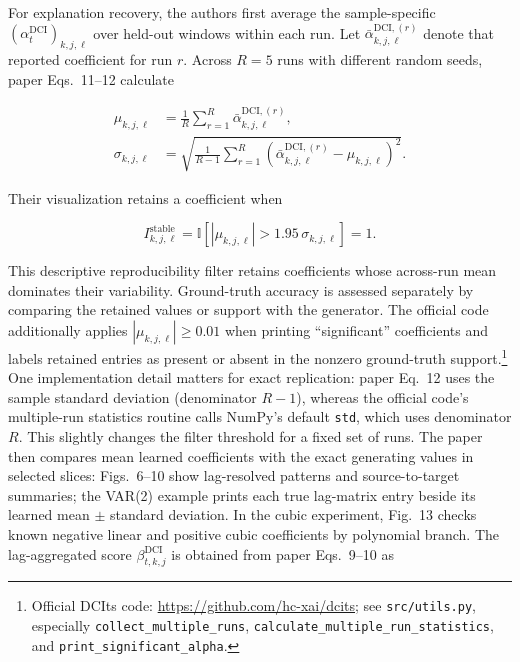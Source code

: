 For explanation recovery, the authors first average the sample-specific
$(\alpha^{\mathrm{DCI}}_t)_{k,j,\ell}$ over held-out windows within each run.
Let $\bar\alpha^{\mathrm{DCI},(r)}_{k,j,\ell}$ denote that reported coefficient
for run $r$. Across $R=5$ runs with different random seeds, paper
Eqs.~11--12 calculate

\begin{equation}
\begin{aligned}
    \mu_{k,j,\ell}
    &= \frac{1}{R}\sum_{r=1}^{R}
       \bar\alpha^{\mathrm{DCI},(r)}_{k,j,\ell}, \\
    \sigma_{k,j,\ell}
    &= \sqrt{\frac{1}{R-1}\sum_{r=1}^{R}
       \left(
       \bar\alpha^{\mathrm{DCI},(r)}_{k,j,\ell}
       -\mu_{k,j,\ell}
       \right)^2}.
\end{aligned}
\end{equation}

Their visualization retains a coefficient when

\begin{equation}
    I^{\mathrm{stable}}_{k,j,\ell}
    =\mathbb{I}\!\left[
        |\mu_{k,j,\ell}|>1.95\,\sigma_{k,j,\ell}
      \right]=1.
\end{equation}

This descriptive reproducibility filter retains coefficients whose across-run
mean dominates their variability. Ground-truth accuracy is assessed separately
by comparing the retained values or support with the generator. The official
code additionally applies
$|\mu_{k,j,\ell}|\geq 0.01$ when printing ``significant'' coefficients and
labels retained entries as present or absent in the nonzero ground-truth
support.\footnote{Official DCIts code:
\url{https://github.com/hc-xai/dcits}; see \texttt{src/utils.py}, especially
\texttt{collect\_multiple\_runs},
\texttt{calculate\_multiple\_run\_statistics}, and
\texttt{print\_significant\_alpha}.}
One implementation detail matters for exact replication: paper Eq.~12 uses the
sample standard deviation (denominator $R-1$), whereas the official code's
multiple-run statistics routine calls NumPy's default \texttt{std}, which uses
denominator $R$. This slightly changes the filter threshold for a fixed set
of runs.
The paper then compares mean learned coefficients with the exact generating
values in selected slices: Figs.~6--10 show lag-resolved patterns and
source-to-target summaries; the VAR(2) example prints each true lag-matrix
entry beside its learned mean $\pm$ standard deviation. In the cubic
experiment, Fig.~13 checks known negative linear and positive cubic
coefficients by polynomial branch. The lag-aggregated score
$\beta^{\mathrm{DCI}}_{t,k,j}$ is obtained from paper Eqs.~9--10 as

